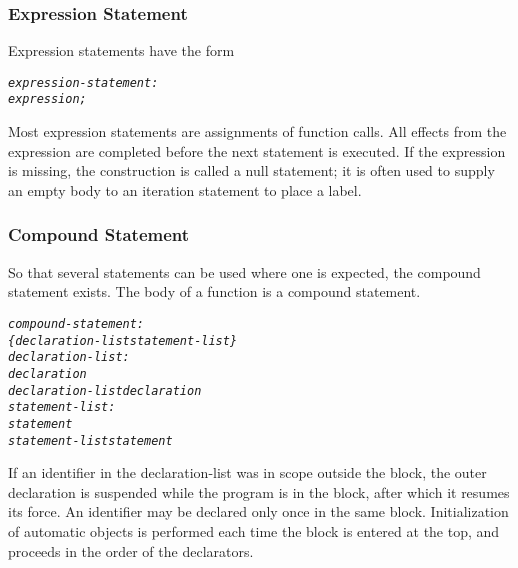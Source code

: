 \documentclass[12pt]{report}
\begin{document}
\subsubsection{Expression Statement}
\begin{doublespace}
Expression statements have the form 
\begin{singlespace}
\begin{alltt}
         \textit{expression-statement:}
              \textit{expression;}
\end{alltt}
\end{singlespace}
Most expression statements are assignments of function calls. All effects from the expression are completed before the next statement is executed. If the expression is missing, the construction is called a null statement; it is often used to supply an empty body to an iteration statement to place a label.
\end{doublespace}

\subsubsection{Compound Statement}
\begin{doublespace}
So that several statements can be used where one is expected, the compound statement exists. The body of a function is a compound statement.
\begin{singlespace}
\begin{alltt}
         \textit{compound-statement:}
              \textit{\{ declaration-list statement-list \}}
         \textit{declaration-list:}
              \textit{declaration}
              \textit{declaration-list declaration}
         \textit{statement-list:}
              \textit{statement}
              \textit{statement-list statement}
\end{alltt}
\end{singlespace}
If an identifier in the declaration-list was in scope outside the block, the outer declaration is suspended while the program is in the block, after which it resumes its force. An identifier may be declared only once in the same block. Initialization of automatic objects is performed each time the block is entered at the top, and proceeds in the order of the declarators. 
\end{doublespace}
\end{document}
